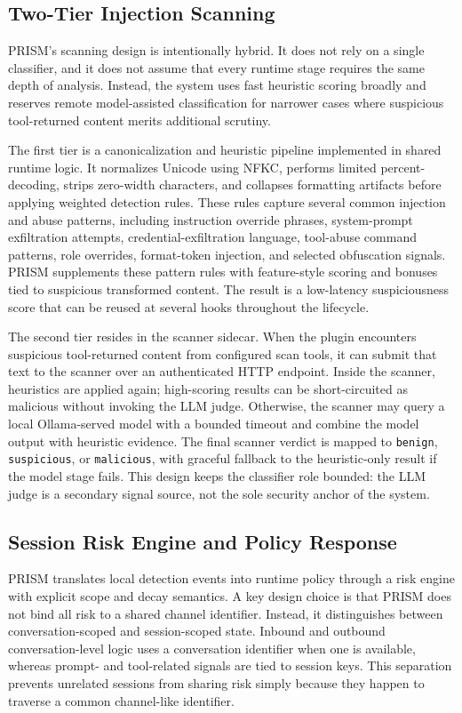 \subsection{Two-Tier Injection Scanning}

PRISM's scanning design is intentionally hybrid. It does not rely on a single classifier, and it does not assume that every runtime stage requires the same depth of analysis. Instead, the system uses fast heuristic scoring broadly and reserves remote model-assisted classification for narrower cases where suspicious tool-returned content merits additional scrutiny.

The first tier is a canonicalization and heuristic pipeline implemented in shared runtime logic. It normalizes Unicode using NFKC, performs limited percent-decoding, strips zero-width characters, and collapses formatting artifacts before applying weighted detection rules. These rules capture several common injection and abuse patterns, including instruction override phrases, system-prompt exfiltration attempts, credential-exfiltration language, tool-abuse command patterns, role overrides, format-token injection, and selected obfuscation signals. PRISM supplements these pattern rules with feature-style scoring and bonuses tied to suspicious transformed content. The result is a low-latency suspiciousness score that can be reused at several hooks throughout the lifecycle.

The second tier resides in the scanner sidecar. When the plugin encounters suspicious tool-returned content from configured scan tools, it can submit that text to the scanner over an authenticated HTTP endpoint. Inside the scanner, heuristics are applied again; high-scoring results can be short-circuited as malicious without invoking the LLM judge. Otherwise, the scanner may query a local Ollama-served model with a bounded timeout and combine the model output with heuristic evidence. The final scanner verdict is mapped to \texttt{benign}, \texttt{suspicious}, or \texttt{malicious}, with graceful fallback to the heuristic-only result if the model stage fails. This design keeps the classifier role bounded: the LLM judge is a secondary signal source, not the sole security anchor of the system.

\subsection{Session Risk Engine and Policy Response}

PRISM translates local detection events into runtime policy through a risk engine with explicit scope and decay semantics. A key design choice is that PRISM does not bind all risk to a shared channel identifier. Instead, it distinguishes between conversation-scoped and session-scoped state. Inbound and outbound conversation-level logic uses a conversation identifier when one is available, whereas prompt- and tool-related signals are tied to session keys. This separation prevents unrelated sessions from sharing risk simply because they happen to traverse a common channel-like identifier.

